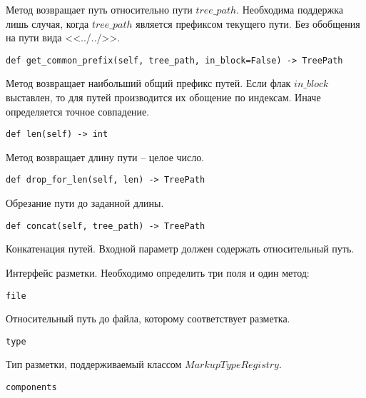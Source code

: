Метод возвращает путь относительно пути $tree\_path$. Необходима поддержка лишь случая, когда $tree\_path$ является префиксом текущего пути. Без обобщения на пути вида <<../../>>.
\\

\begin{lstlisting}
def get_common_prefix(self, tree_path, in_block=False) -> TreePath
\end{lstlisting}

Метод возвращает наибольший общий префикс путей. Если флак $in\_block$ выставлен, то для путей производится их обощение по индексам. Иначе определяется точное совпадение.
\\

\begin{lstlisting}
def len(self) -> int
\end{lstlisting}

Метод возвращает длину пути -- целое число.
\\

\begin{lstlisting}
def drop_for_len(self, len) -> TreePath
\end{lstlisting}

Обрезание пути до заданной длины.
\\

\begin{lstlisting}
def concat(self, tree_path) -> TreePath
\end{lstlisting}

Конкатенация путей. Входной параметр должен содержать относительный путь.
\\


Интерфейс разметки. Необходимо определить три поля и один метод:
\\

\begin{lstlisting}
file
\end{lstlisting}

Относительный путь до файла, которому соответствует разметка.
\\

\begin{lstlisting}
type
\end{lstlisting}

Тип разметки, поддерживаемый классом $MarkupTypeRegistry$.
\\

\begin{lstlisting}
components
\end{lstlisting}

